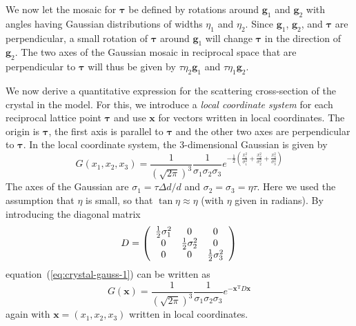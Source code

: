 We now let the mosaic for $\boldsymbol{\tau}$ be defined by rotations
around $\boldsymbol{g}_1$ and $\boldsymbol{g}_2$ with angles having
Gaussian distributions of widths $\eta_1$ and $\eta_2$. Since
$\boldsymbol{g}_1$, $\boldsymbol{g}_2$, and $\boldsymbol{\tau}$ are
perpendicular, a small rotation of $\boldsymbol{\tau}$ around
$\boldsymbol{g}_1$ will change $\boldsymbol{\tau}$ in the direction of
$\boldsymbol{g}_2$. The two axes of the Gaussian mosaic in reciprocal
space that are perpendicular to $\boldsymbol{\tau}$ will thus be given
by $\tau\eta_2\boldsymbol{g}_1$ and $\tau\eta_1\boldsymbol{g}_2$.

We now derive a quantitative expression for the scattering cross-section
of the crystal in the model. For this, we introduce a \emph{local
  coordinate system} for each reciprocal lattice point
$\boldsymbol{\tau}$ and use $\boldsymbol{x}$ for vectors written in local
coordinates. The origin is $\boldsymbol{\tau}$, the first axis
is parallel to $\boldsymbol{\tau}$ and the other two axes are
perpendicular to $\boldsymbol{\tau}$. In the local coordinate system,
the 3-dimensional Gaussian is given by
\begin{equation}
  \label{eq:crystal-gauss-1}
  G(x_1,x_2,x_3) = \frac{1}{(\sqrt{2\pi})^3}\frac{1}{\sigma_1\sigma_2\sigma_3}
  e^{-\frac{1}{2}(\frac{x_1^2}{\sigma_1^2} +
  \frac{x_2^2}{\sigma_2^2} + \frac{x_3^2}{\sigma_3^2})}
\end{equation}
The axes of the Gaussian are $\sigma_1 = \tau\Delta d/d$ and $\sigma_2 =
\sigma_3 = \eta\tau$. Here we used the assumption that $\eta$ is small,
so that $\tan\eta \approx \eta$ (with $\eta$ given in radians).  By
introducing the diagonal matrix
$$
D = \left(
  \begin{array}[c]{ccc}
    \frac{1}{2}\sigma_1^2 & 0 & 0 \\
    0 & \frac{1}{2}\sigma_2^2 & 0 \\
    0 & 0 & \frac{1}{2}\sigma_3^2
  \end{array}\right)
$$
equation~(\ref{eq:crystal-gauss-1}) can be written as
\begin{equation}
  G(\boldsymbol{x}) =
  \frac{1}{(\sqrt{2\pi})^3}\frac{1}{\sigma_1\sigma_2\sigma_3}
  e^{-\boldsymbol{x}^\textrm{T} D \boldsymbol{x}}
\end{equation}
again with $\boldsymbol{x}=(x_1,x_2,x_3)$ written in local coordinates.

